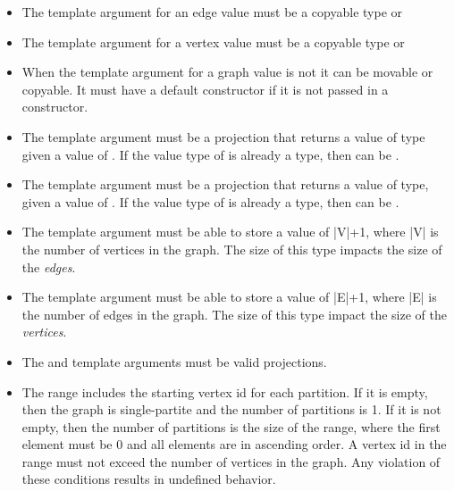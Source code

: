 
\begin{itemdescr}
    \pnum\mandates
        \begin{itemize}
            \item The  template argument for an edge value must be a copyable type or 
            \item The  template argument for a vertex value must be a copyable type or 
            \item When the  template argument for a graph value is not  it can be movable or copyable. It must have a 
                  default constructor if it is not passed in a  constructor.
            \item The  template argument must be a projection that returns a value of  type
                  given a value of . If the value type of  is already a  type, 
                  then  can be .
            \item The  template argument must be a projection that returns a value of  type,
                  given a value of . If the value type of  is already a  type, 
                  then  can be .
        \end{itemize}
    \pnum\preconditions
        \begin{itemize}
            \item The  template argument must be able to store a value of |V|+1, where |V| is the
                  number of vertices in the graph. The size of this type impacts the size of the \textit{edges}.
            \item The  template argument must be able to store a value of |E|+1, where |E| is the
                  number of edges in the graph. The size of this type impact the size of the \textit{vertices}.
            \item The  and  template arguments must be valid projections.
            \item The  range includes the starting vertex id for each partition. If it is empty, then the graph is single-partite
                    and the number of partitions is 1. If it is not empty, then the number of partitions is the size of the range, where the first element
                    must be 0 and all elements are in ascending order. A vertex id in the range must not exceed the number of 
                    vertices in the graph. Any violation of these conditions results in undefined behavior.
        \end{itemize}


\end{itemdescr}
